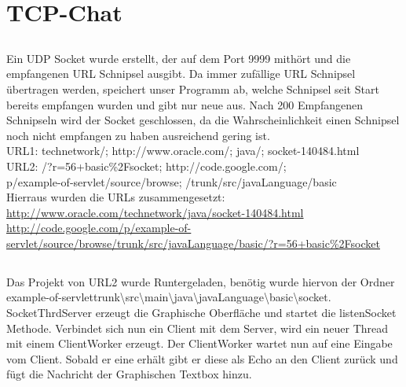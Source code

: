 \documentclass[12pt]{article}
\theoremstyle{plain}
\begin{document}
\section{TCP-Chat}
\subsection{}
Ein UDP Socket wurde erstellt, der auf dem Port 9999 mithört und die empfangenen URL Schnipsel ausgibt. Da immer zufällige URL Schnipsel übertragen werden, speichert unser Programm ab, welche Schnipsel seit Start bereits empfangen wurden und gibt nur neue aus. Nach 200 Empfangenen Schnipseln wird der Socket geschlossen, da die Wahrscheinlichkeit einen Schnipsel noch nicht empfangen zu haben ausreichend gering ist.\\
URL1: technetwork/; http://www.oracle.com/; java/; socket-140484.html\\
URL2: /?r=56+basic\%2Fsocket; http://code.google.com/; \\\indent
\quad p/example-of-servlet/source/browse; /trunk/src/javaLanguage/basic\\
Hierraus wurden die URLs zusammengesetzt:\\
\url{http://www.oracle.com/technetwork/java/socket-140484.html}\\
\url{http://code.google.com/p/example-of-servlet/source/browse/trunk/src/javaLanguage/basic/?r=56+basic\%2Fsocket}
\subsection{}
Das Projekt von URL2 wurde Runtergeladen, benötig wurde hiervon der Ordner example-of-servlettrunk\textbackslash src\textbackslash main\textbackslash java\textbackslash javaLanguage\textbackslash basic\textbackslash socket.\\
SocketThrdServer erzeugt die Graphische Oberfläche und startet die listenSocket Methode. Verbindet sich nun ein Client mit dem Server, wird ein neuer Thread mit einem ClientWorker erzeugt. Der ClientWorker wartet nun auf eine Eingabe vom Client. Sobald er eine erhält gibt er diese als Echo an den Client zurück und fügt die Nachricht der Graphischen Textbox hinzu.
\end{document}
